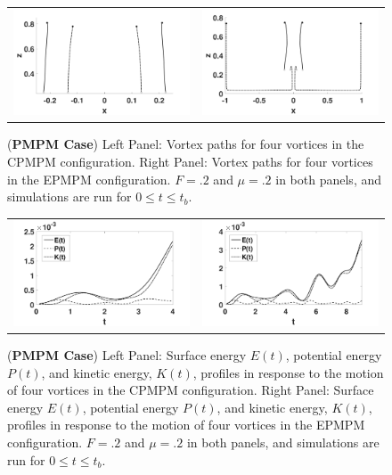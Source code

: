 \documentclass[a4paper,11pt]{article}
\begin{document}
%
\begin{figure}[!h]
\centering
\begin{tabular}{cc}
\includegraphics[width=.5\textwidth]{tracks_F_pt2_tf_4_pmpm} & 
\includegraphics[width=.5\textwidth]{tracks_F_pt2_tf_9_pmpm_sym}
\end{tabular}
\caption{\small  ({\bf PMPM Case}) Left Panel: Vortex paths for four vortices in the CPMPM configuration.  Right Panel: Vortex paths for four vortices in the EPMPM configuration. $F=.2$ and $\mu=.2$ in both panels, and simulations are run for $0\leq t \leq t_{b}$.}
\label{fig:trackpmpm}
\end{figure}

\begin{figure}[!h]
\centering
\begin{tabular}{cc}
\includegraphics[width=.5\textwidth]{energy_profile_mu_pt2_F_pt2_pmpm} &
\includegraphics[width=.5\textwidth]{energy_profile_mu_pt2_F_pt2_pmpm_sym}
\end{tabular}
\caption{\small ({\bf PMPM Case}) Left Panel: Surface energy $E(t)$, potential energy $P(t)$, and kinetic energy, $K(t)$, profiles in response to the motion of four vortices in the CPMPM configuration. Right Panel: Surface energy $E(t)$, potential energy $P(t)$, and kinetic energy, $K(t)$, profiles in response to the motion of four vortices in the EPMPM configuration.  $F=.2$ and $\mu=.2$ in both panels, and simulations are run for $0\leq t \leq t_{b}$.}
\label{fig:eprof_pmpm}
\end{figure}
\end{document}
